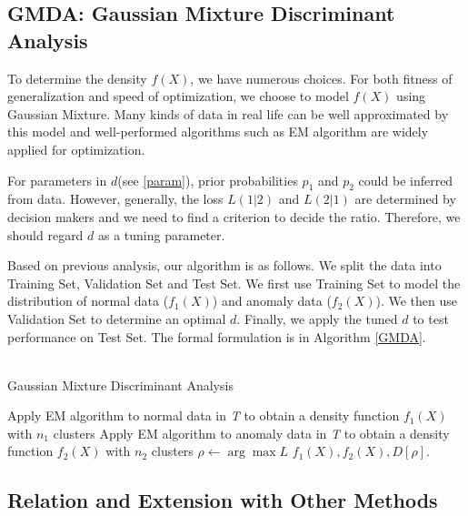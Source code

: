 \documentclass[english]{article}
\begin{document}
\subsection{GMDA: Gaussian Mixture Discriminant Analysis}
\par
To determine the density $f(X)$, we have numerous choices. For both fitness of generalization and speed of optimization, we choose to model $f(X)$ using Gaussian Mixture. Many kinds of data in real life can be well approximated by this model and well-performed algorithms such as EM algorithm are widely applied for optimization.
\par
For parameters in $d$(see \ref{param}), prior probabilities $p_1$ and $p_2$ could be inferred from data. However, generally, the loss $L(1|2)$ and $L(2|1)$ are determined by decision makers and we need to find a criterion to decide the ratio. Therefore, we should regard $d$ as a tuning parameter. 
\par
Based on previous analysis, our algorithm is as follows. We split the data into Training Set, Validation Set and Test Set. We first use Training Set to model the distribution of normal data ($f_1(X)$) and anomaly data ($f_2(X)$). We then use Validation Set to determine an optimal $d$. Finally, we apply the tuned $d$ to test performance on Test Set. The formal formulation is in Algorithm \ref{GMDA}.
\\\\
\begin{algorithm}[H]
\label{GMDA}
\caption{Gaussian Mixture Discriminant Analysis}
\SetAlgoLined
		Apply EM algorithm to normal data in \textit{T} to obtain a density function $f_1(X)$ with $n_1$ clusters\;
		Apply EM algorithm to anomaly data in \textit{T} to obtain a density function $f_2(X)$ with $n_2$ clusters\;
		$\rho \gets \arg\max L$\;
		\Return $f_1(X), f_2(X), D[\rho]$.
\end{algorithm}
 
\subsection{Relation and Extension with Other Methods}
\end{document}
